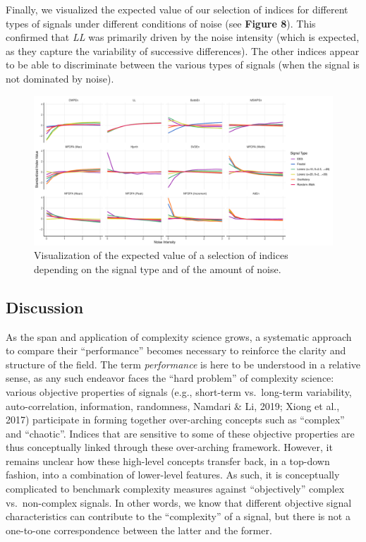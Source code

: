 \documentclass[
  man]{apa6}
\begin{document}
Finally, we visualized the expected value of our selection of indices for different types of signals under different conditions of noise (see \textbf{Figure 8}). This confirmed that \emph{LL} was primarily driven by the noise intensity (which is expected, as they capture the variability of successive differences). The other indices appear to be able to discriminate between the various types of signals (when the signal is not dominated by noise).

\begin{figure}
\centering
\includegraphics{./figures/models-1.pdf}
\caption{\label{fig:models}Visualization of the expected value of a selection of indices depending on the signal type and of the amount of noise.}
\end{figure}

\hypertarget{discussion}{%
\subsection{Discussion}\label{discussion}}

As the span and application of complexity science grows, a systematic approach to compare their ``performance'' becomes necessary to reinforce the clarity and structure of the field. The term \emph{performance} is here to be understood in a relative sense, as any such endeavor faces the ``hard problem'' of complexity science: various objective properties of signals (e.g., short-term vs.~long-term variability, auto-correlation, information, randomness, Namdari \& Li, 2019; Xiong et al., 2017) participate in forming together over-arching concepts such as ``complex'' and ``chaotic''. Indices that are sensitive to some of these objective properties are thus conceptually linked through these over-arching framework. However, it remains unclear how these high-level concepts transfer back, in a top-down fashion, into a combination of lower-level features. As such, it is conceptually complicated to benchmark complexity measures against ``objectively'' complex vs.~non-complex signals. In other words, we know that different objective signal characteristics can contribute to the ``complexity'' of a signal, but there is not a one-to-one correspondence between the latter and the former.
\end{document}
